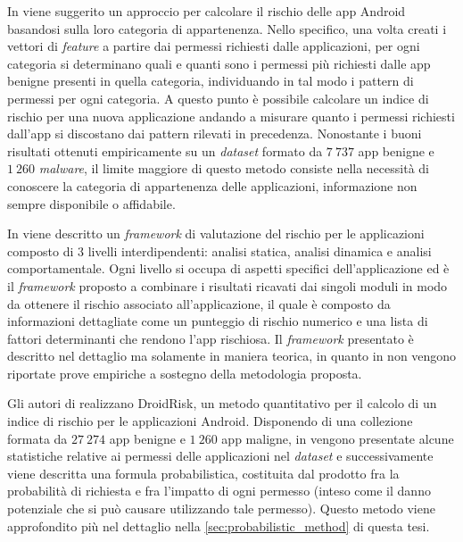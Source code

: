 \documentclass[12pt,a4paper,oneside]{article}
\begin{document}
In \cite{CATEGORICAL_RISK} viene suggerito un approccio per calcolare il rischio delle app Android basandosi sulla loro categoria di appartenenza. Nello specifico, una volta creati i vettori di \textit{feature} a partire dai permessi richiesti dalle applicazioni, per ogni categoria si determinano quali e quanti sono i permessi più richiesti dalle app benigne presenti in quella categoria, individuando in tal modo i pattern di permessi per ogni categoria. A questo punto è possibile calcolare un indice di rischio per una nuova applicazione andando a misurare quanto i permessi richiesti dall'app si discostano dai pattern rilevati in precedenza. Nonostante i buoni risultati ottenuti empiricamente su un \textit{dataset} formato da $7~737$ app benigne e $1~260$ \textit{malware}, il limite maggiore di questo metodo consiste nella necessità di conoscere la categoria di appartenenza delle applicazioni, informazione non sempre disponibile o affidabile.
\newline

In \cite{MULTILAYER_RISK} viene descritto un \textit{framework} di valutazione del rischio per le applicazioni composto di $3$ livelli interdipendenti: analisi statica, analisi dinamica e analisi comportamentale. Ogni livello si occupa di aspetti specifici dell'applicazione ed è il \textit{framework} proposto a combinare i risultati ricavati dai singoli moduli in modo da ottenere il rischio associato all'applicazione, il quale è composto da informazioni dettagliate come un punteggio di rischio numerico e una lista di fattori determinanti che rendono l'app rischiosa. Il \textit{framework} presentato è descritto nel dettaglio ma solamente in maniera teorica, in quanto in \cite{MULTILAYER_RISK} non vengono riportate prove empiriche a sostegno della metodologia proposta.
\newline

Gli autori di \cite{WANG_QUANTITATIVE} realizzano DroidRisk, un metodo quantitativo per il calcolo di un indice di rischio per le applicazioni Android. Disponendo di una collezione formata da $27~274$ app benigne e $1~260$ app maligne, in \cite{WANG_QUANTITATIVE} vengono presentate alcune statistiche relative ai permessi delle applicazioni nel \textit{dataset} e successivamente viene descritta una formula probabilistica, costituita dal prodotto fra la probabilità di richiesta e fra l'impatto di ogni permesso (inteso come il danno potenziale che si può causare utilizzando tale permesso). Questo metodo viene approfondito più nel dettaglio nella \cref{sec:probabilistic_method} di questa tesi.
\end{document}
